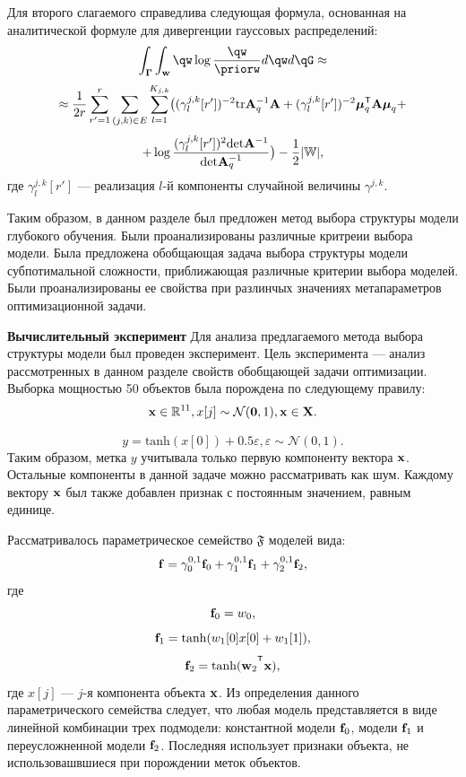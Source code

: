 Для второго слагаемого справедлива следующая формула, основанная на аналитической формуле для дивергенции гауссовых распределений:
\[
    \int_{\G}\int_{\w}\qw\log\frac{\qw}{\priorw}d\qw d\qG \approx
\]
\[
\approx \frac{1}{2r}\sum_{r'=1}^r \sum_{(j,k) \in E} \sum_{l=1}^{K_{j,k}} \bigl( (\gamma^{j,k}_{l}[r'])^{-2}\text{tr}\mathbf{A}_q^{-1}\mathbf{A} + (\gamma^{j,k}_l[r'])^{-2} \boldsymbol{\mu}_q^{\mathsf{T}}\mathbf{A}\boldsymbol{\mu}_q +
\]
\[
+ \log \frac{(\gamma^{j,k}_l[r'])^{2}\text{det}\mathbf{A}^{-1}}{\text{det}\mathbf{A}_q^{-1}}  \bigr) - \frac{1}{2}|\mathbb{W}|,
\]
где $\gamma^{j,k}_l[r']$ --- реализация $l$-й компоненты случайной величины $\gamma^{j,k}$.

Таким образом, в данном разделе был предложен метод выбора структуры модели глубокого обучения. Были проанализированы  различные критреии выбора модели. Была предложена обобщающая задача выбора структуры модели субпотимальной сложности, приближающая различные критерии выбора моделей. Были проанализированы ее свойства при разлинчых значениях метапараметров оптимизационной задачи. 

\textbf{Вычислительный эксперимент}
Для анализа предлагаемого метода выбора структуры модели был проведен эксперимент. Цель эксперимента --- анализ рассмотренных в данном разделе свойств обобщающей задачи оптимизации.
Выборка мощностью 50 объектов была порождена по следующему правилу:
\[
    \mathbf{x} \in \mathbb{R}^{11}, x[j] \sim \mathcal{N}(\mathbf{0},1), \mathbf{x} \in \mathbf{X}.
\]


\[
    y = \text{tanh}(x[0]) + 0.5\varepsilon, \varepsilon \sim \mathcal{N}(0,1).
\]
Таким образом, метка $y$ учитывала только первую компоненту вектора $\mathbf{x}$. Остальные компоненты в данной задаче можно рассматривать как шум. Каждому вектору $\mathbf{x}$ был также добавлен признак с постоянным значением, равным единице. 

Рассматривалось параметрическое семейство $\mathfrak{F}$ моделей вида:
\[
    \mathbf{f}  = \gamma_0^{0,1}\mathbf{f}_0 + \gamma_1^{0,1}\mathbf{f}_1 + \gamma_2^{0,1}\mathbf{f}_2,
\]
где
\[
    \mathbf{f}_0 = w_0,
\]
\[
    \mathbf{f}_1 = \text{tanh}(w_1[0] x[0] + w_1[1] ),
\]
\[
    \model_2 = \text{tanh}({\w_2}^{\T}\x),
\]
где $x[j]$ --- $j$-я компонента объекта $\mathbf{x}$.
Из определения данного параметрического семейства следует, что любая модель представляется в виде линейной комбинации трех подмодели: константной модели $\mathbf{f}_0$, модели $\mathbf{f}_1$ и переусложненной модели $\mathbf{f}_2$. Последняя использует признаки объекта, не использовашвшиеся при порождении меток объектов.

